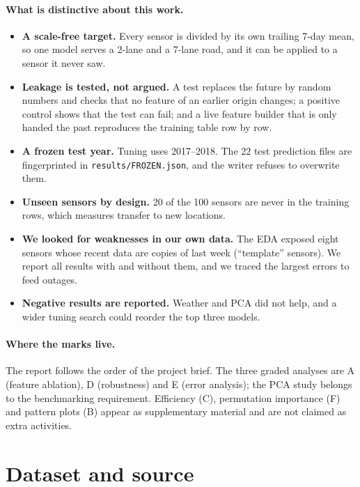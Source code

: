 \documentclass[11pt,a4paper]{article}
\newcommand{\code}[1]{\texttt{#1}}
\begin{document}
\paragraph{What is distinctive about this work.}
\begin{itemize}
\item \textbf{A scale-free target.} Every sensor is divided by its own trailing 7-day mean, so one model serves a 2-lane and a 7-lane road, and it can be applied to a sensor it
never saw.
\item \textbf{Leakage is tested, not argued.} A test replaces the future by random numbers and checks that no feature of an earlier origin changes; a positive control shows that the test
can fail; and a live feature builder that is only handed the past reproduces the training table row by row.
\item \textbf{A frozen test year.} Tuning uses 2017--2018. The 22 test prediction files are fingerprinted in \code{results/FROZEN.json}, and the writer refuses to overwrite them.
\item \textbf{Unseen sensors by design.} 20 of the 100 sensors are never in the training rows, which measures transfer to new locations.
\item \textbf{We looked for weaknesses in our own data.} The EDA exposed eight sensors whose recent data are copies of last week (``template'' sensors). We report all results with and
without them, and we traced the largest errors to feed outages.
\item \textbf{Negative results are reported.} Weather and PCA did not help, and a wider tuning search could reorder the top three models.
\end{itemize}

\paragraph{Where the marks live.} The report follows the order of the project brief. The three graded analyses are A (feature ablation), D (robustness) and E (error
analysis); the PCA study belongs to the benchmarking requirement. Efficiency (C), permutation importance (F) and pattern plots (B) appear as
supplementary material and are not claimed as extra activities.

\section{Dataset and source}
\end{document}
